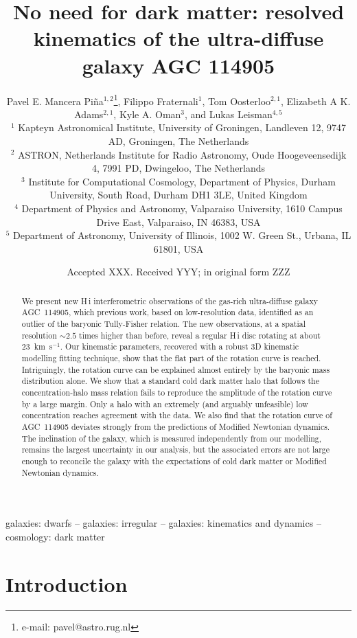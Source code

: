 \documentclass[fleqn,usenatbib]{mnras}
\title[No need for dark matter in the UDG AGC~114905]{No need for dark matter: resolved kinematics of the ultra-diffuse galaxy AGC 114905}
\author[Pavel E. Mancera Pi\~na et al.]{Pavel E. Mancera Pi\~na$^{1,2}$\thanks{e-mail: pavel@astro.rug.nl},
Filippo Fraternali$^{1}$, Tom Oosterloo$^{2,1}$, Elizabeth A K. Adams$^{2,1}$, \newauthor Kyle A. Oman$^{3}$, and Lukas Leisman$^{4,5}$\\
$^{1}$ Kapteyn Astronomical Institute, University of Groningen, Landleven 12, 9747 AD, Groningen, The Netherlands\\
$^{2}$ ASTRON, Netherlands Institute for Radio Astronomy, Oude Hoogeveensedijk 4, 7991 PD, Dwingeloo, The Netherlands\\
$^{3}$ Institute for Computational Cosmology, Department of Physics, Durham University, South Road, Durham DH1 3LE, United Kingdom\\
$^{4}$ Department of Physics and Astronomy, Valparaiso University, 1610 Campus Drive East, Valparaiso, IN 46383, USA\\
$^{5}$ Department of Astronomy, University of Illinois, 1002 W. Green St., Urbana, IL 61801, USA\\
}
\date{Accepted XXX. Received YYY; in original form ZZZ}
\begin{document}
\label{firstpage}
\pagerange{\pageref{firstpage}--\pageref{lastpage}}
\maketitle

\begin{abstract}
We present new H\,{\sc i} interferometric observations of the gas-rich ultra-diffuse galaxy AGC~114905, which previous work, based on low-resolution data, identified as an outlier of the baryonic Tully-Fisher relation. The new observations, at a spatial resolution $\sim 2.5$ times higher than before, reveal a regular H\,{\sc i} disc rotating at about 23~km~s$^{-1}$. Our kinematic parameters, recovered with a robust 3D kinematic modelling fitting technique, show that the flat part of the rotation curve is reached. Intriguingly, the rotation curve can be explained almost entirely by the baryonic mass distribution alone. We show that a standard cold dark matter halo that follows the concentration-halo mass relation fails to reproduce the amplitude of the rotation curve by a large margin. Only a halo with an extremely (and arguably unfeasible) low concentration reaches agreement with the data. We also find that the rotation curve of AGC~114905 deviates strongly from the predictions of Modified Newtonian dynamics. The inclination of the galaxy, which is measured independently from our modelling, remains the largest uncertainty in our analysis, but the associated errors are not large enough to reconcile the galaxy with the expectations of cold dark matter or Modified Newtonian dynamics.
\end{abstract}

\begin{keywords}
galaxies: dwarfs -- galaxies: irregular -- galaxies: kinematics and dynamics -- cosmology: dark matter
\end{keywords}



\section{Introduction}
\end{document}
